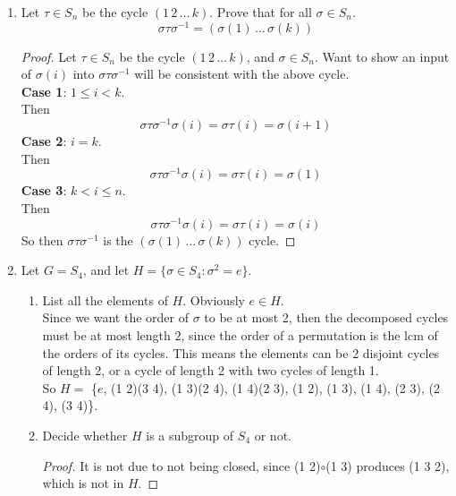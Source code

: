 \documentclass[12pt]{article}
\begin{document}
\begin{enumerate}
		\item Let $\tau \in S_n$ be the cycle $(1\,2\,\ldots \, k)$. Prove that for all $\sigma \in S_n$.
		\[\sigma\tau\sigma^{-1} = (\sigma(1)\,\ldots\,\sigma(k))\]
		\begin{proof}
			Let $\tau \in S_n$ be the cycle $(1\,2\,\ldots \, k)$, and $\sigma \in S_n$. Want to show an input of $\sigma(i)$ into $\sigma\tau\sigma^{-1}$ will be consistent with the above cycle.\\
			\textbf{Case 1}: $1\leq i < k$.\\
			Then \[\sigma\tau\sigma^{-1}\sigma(i) = \sigma\tau(i) = \sigma(i+1)\]
			\textbf{Case 2}: $i = k$.\\
			Then \[\sigma\tau\sigma^{-1}\sigma(i) = \sigma\tau(i) = \sigma(1)\]
			\textbf{Case 3}: $k < i \leq n$.\\
			Then \[\sigma\tau\sigma^{-1}\sigma(i) = \sigma\tau(i) = \sigma(i)\]
			So then $\sigma\tau\sigma^{-1}$ is the $(\sigma(1)\,\ldots\,\sigma(k))$ cycle.
		\end{proof}
		
		\item Let $G = S_4$, and let $H = \{\sigma\in S_4 : \sigma^2 = e\}$.
		\begin{enumerate}
			\item List all the elements of $H$.\m
			Obviously $e\in H$.\\
			Since we want the order of $\sigma$ to be at most 2, then the decomposed cycles must be at most length $2$, since the order of a permutation is the lcm of the orders of its cycles. This means the elements can be 2 disjoint cycles of length 2, or a cycle of length 2 with two cycles of length 1.\\
			So $H =$ \{$e$, (1 2)(3 4), (1 3)(2 4), (1 4)(2 3), (1 2), (1 3), (1 4), (2 3), (2 4), (3 4)\}.
			\item Decide whether $H$ is a subgroup of $S_4$ or not.
			\begin{proof}
				It is not due to not being closed, since (1 2)$\circ$(1 3) produces (1 3 2), which is not in $H$.
			\end{proof}
		\end{enumerate}
	

\end{enumerate}
\end{document}
